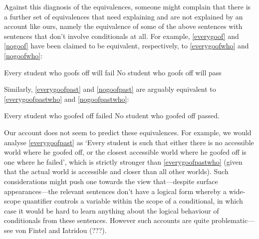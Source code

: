 \documentclass[If.tex]{subfiles}
\begin{document}
Against this diagnosis of the equivalences, someone might complain that there is a further set of equivalences that need explaining and are not explained by an account like ours, namely the equivalence of some of the above sentences with sentences that don't involve conditionals at all. For example, \ref{everygoof} and \ref{nogoof} have been claimed to be equivalent, respectively, to \ref{everygoofwho} and \ref{nogoofwho}:
\begin{prop}
	\nitem \label{everygoofwho}
	Every student who goofs off will fail
	\nitem \label{nogoofwho}
	No student who goofs off will pass
	\end{prop}
Similarly, \ref{everygoofpast} and \ref{nogoofpast} are arguably equivalent to \ref{everygoofpastwho} and \ref{nogoofpastwho}:
\begin{prop}
	\nitem \label{everygoofpastwho}
	Every student who goofed off failed
	\nitem \label{nogoofpastwho}
	No student who goofed off passed.
\end{prop}
Our account does not seem to predict these equivalences. For example, we would analyse \ref{everygoofpast} as ‘Every student is such that either there is no accessible world where he goofed off, or the closest accessible world where he goofed off is one where he failed’, which is strictly stronger than \ref{everygoofpastwho} (given that the actual world is accessible and closer than all other worlds). Such considerations might push one towards the view that---despite surface appearances---the relevant sentences don't have a logical form whereby a wide-scope quantifier controls a variable within the scope of a conditional, in which case it would be hard to learn anything about the logical behaviour of conditionals from these sentences. However such accounts are quite problematic---see von Fintel and Iatridou (???).
\end{document}
